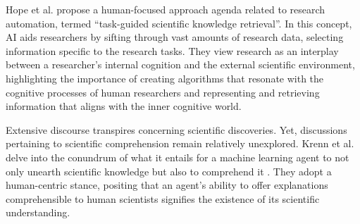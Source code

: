 Hope et al. \cite{hope2022computational} propose a human-focused approach agenda related to research automation, termed ``task-guided scientific knowledge retrieval''. In this concept, AI aids researchers by sifting through vast amounts of research data, selecting information specific to the research tasks. They view research as an interplay between a researcher's internal cognition and the external scientific environment, highlighting the importance of creating algorithms that resonate with the cognitive processes of human researchers and representing and retrieving information that aligns with the inner cognitive world.


Extensive discourse transpires concerning scientific discoveries. Yet, discussions pertaining to scientific comprehension remain relatively unexplored. Krenn et al. delve into the conundrum of what it entails for a machine learning agent to not only unearth scientific knowledge but also to comprehend it \cite{krenn2022scientific}. They adopt a human-centric stance, positing that an agent's ability to offer explanations comprehensible to human scientists signifies the existence of its scientific understanding.

